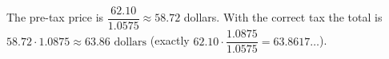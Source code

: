 The pre-tax price is $\dfrac{62.10}{1.0575}\approx58.72$ dollars. With the correct tax the total is $58.72\cdot1.0875\approx\boxed{63.86\text{ dollars}}$ (exactly $62.10\cdot\dfrac{1.0875}{1.0575}=63.8617\ldots$).
